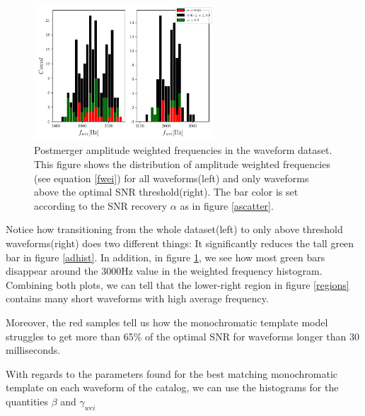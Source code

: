 \begin{figure}[hbt!]
\begin{center}
\includegraphics[width=0.6\textwidth, angle=0]{images/Data_analysis/results/alpha_fhist.pdf}
\captionsetup{width=0.8\textwidth}
\caption[Postmerger amplitude weighted frequencies in the postmerger waveform dataset]{Postmerger amplitude weighted frequencies in the waveform dataset. This figure shows the distribution of amplitude weighted frequencies (see equation \ref{fwei}) for all waveforms(left) and only waveforms above the optimal SNR threshold(right). The bar color is set according to the SNR recovery $\alpha$ as in figure \ref{ascatter}.}
\label{afhist}
\end{center}
\end{figure}
\FloatBarrier


Notice how transitioning from the whole dataset(left) to only above threshold waveforms(right) does two different things: It significantly reduces the tall green bar in figure \ref{adhist}. In addition, in figure \ref{afhist}, we see how most green bars disappear around the 3000Hz value in the weighted frequency histogram. Combining both plots, we can tell that the lower-right region in figure \ref{regions} contains many short waveforms with high average frequency.

Moreover, the red samples tell us how the monochromatic template model struggles to get more than 65\% of the optimal SNR for waveforms longer than 30 milliseconds. 


\newpage 

With regards to the parameters found for the best matching monochromatic template on each waveform of the catalog, we can use the histograms for the quantities  $\beta$ and $\gamma_{wei}$ 

